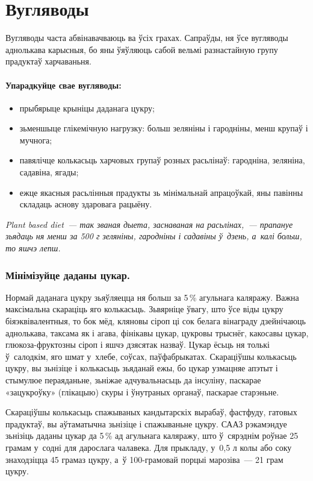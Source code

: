 \section{Вугляводы}

Вугляводы часта абвінавачваюць ва ўсіх грахах. Сапраўды, ня ўсе вугляводы аднолькава карысныя, бо яны ўяўляюць сабой вельмі разнастайную групу прадуктаў харчаваньня.

\paragraph{Упарадкуйце свае вугляводы:}
\begin{itemize}
  \item прыбярыце крыніцы даданага цукру;
  \item зьменшыце глікемічную нагрузку: больш зеляніны і гародніны, менш крупаў і мучнога;
  \item павялічце колькасьць харчовых групаў розных расьлінаў: гародніна, зеляніна, садавіна, ягады;
  \item ежце якасныя расьлінныя прадукты зь мінімальнай апрацоўкай, яны павінны складаць аснову здаровага рацыёну.
\end{itemize}

\emph{Plant based diet~--- так званая дыета, заснаваная на расьлінах,~--- прапануе зьядаць ня менш за 500 г зеляніны, гародніны і садавіны ў~дзень, а~калі больш, то яшчэ лепш.}

\subsubsection{Мінімізуйце даданы цукар.} 
Нормай даданага цукру зьяўляецца ня больш за 5\,\% агульнага каляражу. Важна максімальна скараціць яго колькасьць. Зьвярніце ўвагу, што ўсе віды цукру біяэквівалентныя, то бок мёд, кляновы сіроп ці сок белага вінаграду дзейнічаюць аднолькава, таксама як і агава, фінікавы цукар, цукровы трыснёг, какосавы цукар, глюкоза-фруктозны сіроп і яшчэ дзясятак назваў. Цукар ёсьць ня толькі ў~салодкім, яго шмат у~хлебе, соўсах, паўфабрыкатах. Скараціўшы колькасьць цукру, вы зьнізіце і колькасьць зьяданай ежы, бо цукар узмацняе апэтыт і стымулюе пераяданьне, зьніжае адчувальнасьць да інсуліну, паскарае «зацукроўку» (глікацыю) скуры і ўнутраных органаў, паскарае старэньне.

Скараціўшы колькасьць спажываных кандытарскіх вырабаў, фастфуду, гатовых прадуктаў, вы аўтаматычна зьнізіце і спажываньне цукру. СААЗ рэкамэндуе зьнізіць даданы цукар да 5\,\% ад агульнага каляражу, што ў~сярэднім роўнае 25 грамам у~содні для дарослага чалавека. Для прыкладу, у~0,5 л колы або соку знаходзіцца 45 грамаз цукру, а~ў 100-грамовай порцыі марозіва~--- 21 грам цукру.

